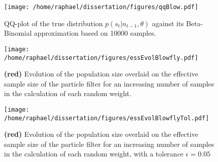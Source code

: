 \documentclass[12pt]{article}
\begin{document}
	\begin{figure}[htb]
		\centering
		\begin{minipage}{0.9\textwidth}
			\centering
			\texttt{[image: /home/raphael/dissertation/figures/qqBlow.pdf]}
		\end{minipage}
		\caption[QQ-plot of the true distribution $p(s_t | n_{t-1}, \theta)$ against its Beta-Binomial approximation.]{QQ-plot of the true distribution $p(s_t | n_{t-1}, \theta)$ against its Beta-Binomial approximation based on 10000 samples.}
		\label{fig:qqBlow}
	\end{figure}

	\begin{figure}[htb]
		\centering
		\begin{minipage}{0.9\textwidth}
			\centering
			\texttt{[image: /home/raphael/dissertation/figures/essEvolBlowfly.pdf]}
		\end{minipage}
		\caption{\textbf{(red)} Evolution of the population size overlaid on the effective sample size of the particle filter for an increasing number of samples in the calculation of each random weight.}
		\label{fig:essBlow}
	\end{figure}

	\begin{figure}[htb]
		\centering
		\begin{minipage}{0.9\textwidth}
			\centering
			\texttt{[image: /home/raphael/dissertation/figures/essEvolBlowflyTol.pdf]}
		\end{minipage}
		\caption{\textbf{(red)} Evolution of the population size overlaid on the effective sample size of the particle filter for an increasing number of samples in the calculation of each random weight, with a tolerance $\epsilon=0.05$}
		\label{fig:essBlowTol}
	\end{figure}
	
\end{document}

